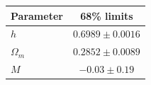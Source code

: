 \begin{tabular} { l  c}

 Parameter &  68\% limits\\
\hline
{\boldmath$h              $} & $0.6989\pm 0.0016          $\\

{\boldmath$Ω_m            $} & $0.2852\pm 0.0089          $\\

{\boldmath$M              $} & $-0.03\pm 0.19             $\\
\hline
\end{tabular}